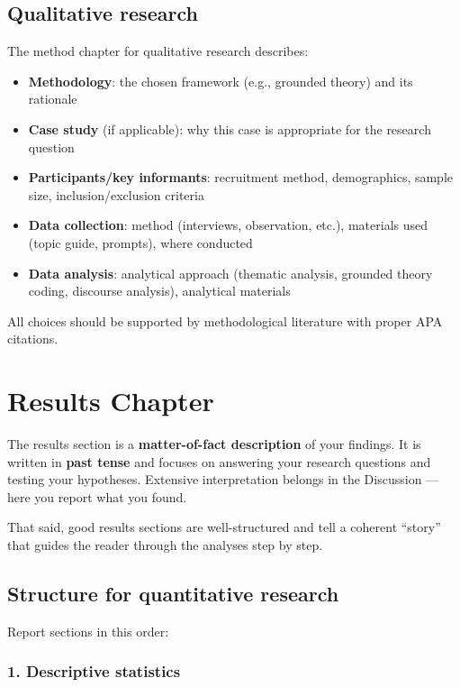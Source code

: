 \documentclass[
  11pt,
  a4paper,
]{scrbook}
\providecommand{\tightlist}{%
  \setlength{\itemsep}{0pt}\setlength{\parskip}{0pt}}\usepackage{longtable,booktabs,array}
\begin{document}
\section{Qualitative research}\label{qualitative-research-1}

The method chapter for qualitative research describes:

\begin{itemize}
\tightlist
\item
  \textbf{Methodology}: the chosen framework (e.g., grounded theory) and
  its rationale
\item
  \textbf{Case study} (if applicable): why this case is appropriate for
  the research question
\item
  \textbf{Participants/key informants}: recruitment method,
  demographics, sample size, inclusion/exclusion criteria
\item
  \textbf{Data collection}: method (interviews, observation, etc.),
  materials used (topic guide, prompts), where conducted
\item
  \textbf{Data analysis}: analytical approach (thematic analysis,
  grounded theory coding, discourse analysis), analytical materials
\end{itemize}

All choices should be supported by methodological literature with proper
APA citations.

\chapter{Results Chapter}\label{results-chapter}

The results section is a \textbf{matter-of-fact description} of your
findings. It is written in \textbf{past tense} and focuses on answering
your research questions and testing your hypotheses. Extensive
interpretation belongs in the Discussion --- here you report what you
found.

That said, good results sections are well-structured and tell a coherent
``story'' that guides the reader through the analyses step by step.

\section{Structure for quantitative
research}\label{structure-for-quantitative-research}

Report sections in this order:

\subsection{1. Descriptive statistics}\label{descriptive-statistics}
\end{document}
